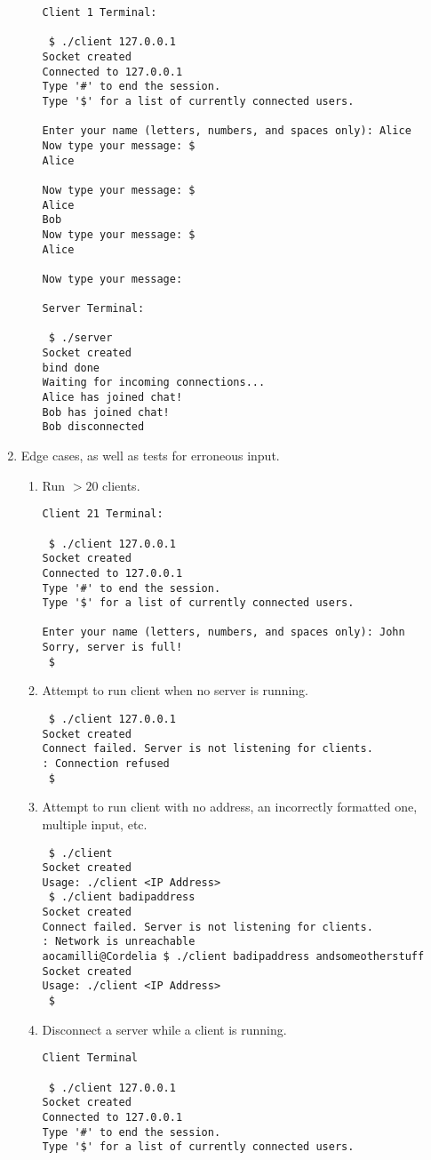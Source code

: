 \documentclass[titlepage, 14pt]{article}
\begin{document}
\begin{enumerate}
\begin{enumerate}
\begin{verbatim}
Client 1 Terminal:

 $ ./client 127.0.0.1
Socket created
Connected to 127.0.0.1
Type '#' to end the session.
Type '$' for a list of currently connected users.

Enter your name (letters, numbers, and spaces only): Alice
Now type your message: $
Alice

Now type your message: $
Alice
Bob
Now type your message: $
Alice

Now type your message: 

Server Terminal:

 $ ./server
Socket created
bind done
Waiting for incoming connections...
Alice has joined chat!
Bob has joined chat!
Bob disconnected
\end{verbatim}
  \end{enumerate}
\item Edge cases, as well as tests for erroneous input.
  \begin{enumerate}
    \item Run $>20$ clients.
\begin{verbatim}
Client 21 Terminal:

 $ ./client 127.0.0.1
Socket created
Connected to 127.0.0.1
Type '#' to end the session.
Type '$' for a list of currently connected users.

Enter your name (letters, numbers, and spaces only): John
Sorry, server is full!
 $ 
\end{verbatim}
    \item Attempt to run client when no server is running.
\begin{verbatim}
 $ ./client 127.0.0.1
Socket created
Connect failed. Server is not listening for clients.
: Connection refused
 $ 
\end{verbatim}
    \item Attempt to run client with no address, an incorrectly formatted one, multiple input, etc.
\begin{verbatim}
 $ ./client
Socket created
Usage: ./client <IP Address>
 $ ./client badipaddress
Socket created
Connect failed. Server is not listening for clients.
: Network is unreachable
aocamilli@Cordelia $ ./client badipaddress andsomeotherstuff
Socket created
Usage: ./client <IP Address>
 $ 
\end{verbatim}
    \item Disconnect a server while a client is running.
\begin{verbatim}
Client Terminal

 $ ./client 127.0.0.1
Socket created
Connected to 127.0.0.1
Type '#' to end the session.
Type '$' for a list of currently connected users.


\end{verbatim}
\end{enumerate}
\end{enumerate}
\end{document}
